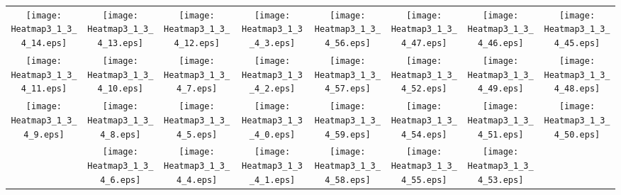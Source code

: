 \documentclass{standalone}
\begin{document}
\begin{tabular}{ *8{c} }
\texttt{[image: Heatmap3\_1\_3\_4\_14.eps]} & \texttt{[image: Heatmap3\_1\_3\_4\_13.eps]} & \texttt{[image: Heatmap3\_1\_3\_4\_12.eps]} & \texttt{[image: Heatmap3\_1\_3\_4\_3.eps]} & \texttt{[image: Heatmap3\_1\_3\_4\_56.eps]} & \texttt{[image: Heatmap3\_1\_3\_4\_47.eps]} & \texttt{[image: Heatmap3\_1\_3\_4\_46.eps]} & \texttt{[image: Heatmap3\_1\_3\_4\_45.eps]} \\
\texttt{[image: Heatmap3\_1\_3\_4\_11.eps]} & \texttt{[image: Heatmap3\_1\_3\_4\_10.eps]} & \texttt{[image: Heatmap3\_1\_3\_4\_7.eps]} & \texttt{[image: Heatmap3\_1\_3\_4\_2.eps]} & \texttt{[image: Heatmap3\_1\_3\_4\_57.eps]} & \texttt{[image: Heatmap3\_1\_3\_4\_52.eps]} & \texttt{[image: Heatmap3\_1\_3\_4\_49.eps]} & \texttt{[image: Heatmap3\_1\_3\_4\_48.eps]} \\
\texttt{[image: Heatmap3\_1\_3\_4\_9.eps]} & \texttt{[image: Heatmap3\_1\_3\_4\_8.eps]} & \texttt{[image: Heatmap3\_1\_3\_4\_5.eps]} & \texttt{[image: Heatmap3\_1\_3\_4\_0.eps]} & \texttt{[image: Heatmap3\_1\_3\_4\_59.eps]} & \texttt{[image: Heatmap3\_1\_3\_4\_54.eps]} & \texttt{[image: Heatmap3\_1\_3\_4\_51.eps]} & \texttt{[image: Heatmap3\_1\_3\_4\_50.eps]} \\
 & \texttt{[image: Heatmap3\_1\_3\_4\_6.eps]} & \texttt{[image: Heatmap3\_1\_3\_4\_4.eps]} & \texttt{[image: Heatmap3\_1\_3\_4\_1.eps]} & \texttt{[image: Heatmap3\_1\_3\_4\_58.eps]} & \texttt{[image: Heatmap3\_1\_3\_4\_55.eps]} & \texttt{[image: Heatmap3\_1\_3\_4\_53.eps]} &  
\end{tabular}
\end{document}
